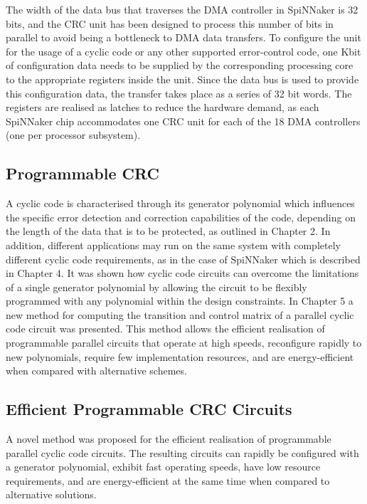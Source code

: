 \documentclass[a4paper, 11pt]{article}
\begin{document}
The width of the data bus that traverses the DMA controller in SpiNNaker is 32 bits, and the CRC unit has been designed to process this number of bits in parallel to avoid being a bottleneck to DMA data transfers. To configure the unit for the usage of a cyclic code or any other supported error-control code, one Kbit of configuration data needs to be supplied by the corresponding processing core to the appropriate registers inside the unit. Since the data bus is used to provide this configuration data, the transfer takes place as a series of 32 bit words. The registers are realised as latches to reduce the hardware demand, as each SpiNNaker chip accommodates one CRC unit for each of the 18 DMA controllers (one per processor subsystem).

\subsection{Programmable CRC}
A cyclic code is characterised through its generator polynomial which influences the specific error detection and correction capabilities of the code, depending on the length of the data that is to be protected, as outlined in Chapter 2. In addition, different applications may run on the same system with completely different cyclic code requirements, as in the case of SpiNNaker which is described in Chapter 4. It was shown how cyclic code circuits can overcome the limitations of a single generator polynomial by allowing the circuit to be flexibly programmed with any polynomial within the design constraints. In Chapter 5 a new method for computing the transition and control matrix of a parallel cyclic code circuit was presented. This method allows the efficient realisation of programmable parallel circuits that operate at high speeds, reconfigure rapidly to new polynomials, require few implementation resources, and are energy-efficient when compared with alternative schemes.

\subsection{Efficient Programmable CRC Circuits}

A novel method was proposed for the efficient realisation of programmable parallel cyclic code circuits. The resulting circuits can rapidly be configured with a generator polynomial, exhibit fast operating speeds, have low resource requirements, and are energy-efficient at the same time when compared to alternative solutions.
\end{document}
